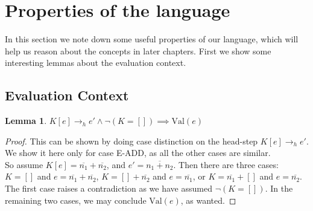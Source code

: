 \documentclass[twoside,11pt,openright]{report}
\newtheorem{lemma}[theorem]{Lemma}
\theoremstyle{definition}
\newcommand{\expr}{e}
\newcommand{\Num}[1]{\overline{#1}}
\newcommand{\empelctx}{[]}
\newcommand{\elctx}{K}
\newcommand{\hstep}{\rightarrow_h}
\newcommand{\Val}[1]{\mathrm{Val}(#1)}
\begin{document}
\section{Properties of the language}
In this section we note down some useful properties of our language, which will help us reason about the concepts in later chapters. First we show some interesting lemmas about the evaluation context.

\subsection{Evaluation Context}
\begin{lemma}\label{lem:headstep_val}
  $\elctx[\expr] \hstep \expr' \land \neg (\elctx = \empelctx) \implies \Val{e}$
\end{lemma}
\begin{proof}
  This can be shown by doing case distinction on the head-step $\elctx[\expr] \hstep \expr'$. We show it here only for case E-ADD, as all the other cases are similar. \medskip\\
  So assume $\elctx[\expr] = \Num{n_1} + \Num{n_2}$, and $\expr' = \Num{n_1 + n_2}$.
  Then there are three cases: $\elctx = []$ and $\expr = \Num{n_1} + \Num{n_2}$, $\elctx = [] + \Num{n_2}$ and $\expr = \Num{n_1}$, or $\elctx = \Num{n_1} + []$ and $\expr = \Num{n_2}$. The first case raises a contradiction as we have assumed $\neg (\elctx = \empelctx)$. In the remaining two cases, we may conclude $\Val{\expr}$, as wanted.
\end{proof}
\end{document}
